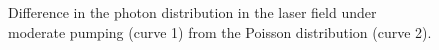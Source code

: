 \begin{figure}
\centering



\caption{Difference in the photon distribution in the laser field under moderate
  pumping (curve 1) from the Poisson distribution 
(curve 2).}
\label{figPart2Ch1_5}
\end{figure}